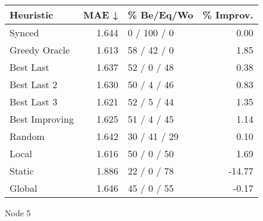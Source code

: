 \begin{tabular}{lrlr}
\toprule
\textbf{Heuristic} & \textbf{MAE ↓} & \textbf{\% Be/Eq/Wo} & \textbf{\% Improv.} \\
\midrule
            Synced &          1.644 &          0 / 100 / 0 &                0.00 \\
     Greedy Oracle &          1.613 &          58 / 42 / 0 &                1.85 \\
         Best Last &          1.637 &          52 / 0 / 48 &                0.38 \\
       Best Last 2 &          1.630 &          50 / 4 / 46 &                0.83 \\
       Best Last 3 &          1.621 &          52 / 5 / 44 &                1.35 \\
    Best Improving &          1.625 &          51 / 4 / 45 &                1.14 \\
            Random &          1.642 &         30 / 41 / 29 &                0.10 \\
             Local &          1.616 &          50 / 0 / 50 &                1.69 \\
            Static &          1.886 &          22 / 0 / 78 &              -14.77 \\
            Global &          1.646 &          45 / 0 / 55 &               -0.17 \\
\bottomrule
\end{tabular}
\caption{Node 5}
\label{tab:ds_non_lr01_le2_bs2_5}
